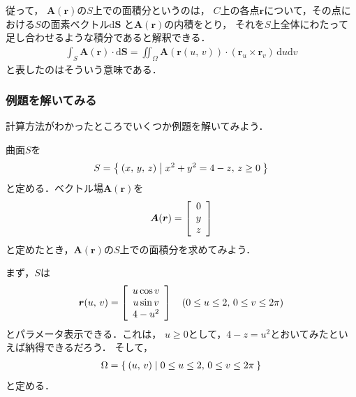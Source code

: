 従って，
$\bm{A}(\bm{r})$の$S$上での面積分というのは，
$C$上の各点$\bm{r}$について，その点における$S$の面素ベクトル$\mathrm{d}\bm{S}$
と$\bm{A}(\bm{r})$の内積をとり，
それを$S$上全体にわたって足し合わせるような積分であると解釈できる．
\begin{align}
\int_S \bm{A}(\bm{r}) \cdot \mathrm{d} \bm{S} 
= \iint_{\Omega} \bm{A}( \bm{r}(u, \, v)) \cdot ( \bm{r}_u \times \bm{r}_v ) 
\, \mathrm{d}u \mathrm{d}v
\label{eq:mensekibunkeisan}
\end{align}
と表したのはそういう意味である．
\subsubsection{例題を解いてみる}
計算方法がわかったところでいくつか例題を解いてみよう．

曲面$S$を
\begin{align*}
S = \Set{ (x, \, y, \, z) | x^2 + y^2 = 4 - z , \, z \geq 0}
\end{align*}
と定める．ベクトル場$\bm{A}(\bm{r})$を
\begin{align*}
\bm{A} (\bm{r} ) = \left[
\renewcommand{\arraystretch}{1}
\begin{array}{c}
0 \\
y \\
z
\end{array}
\right]
\end{align*}
と定めたとき，$\bm{A}(\bm{r})$の$S$上での面積分を求めてみよう．

まず，$S$は
\begin{align*}
\bm{r} (u, \, v) = \left[
\renewcommand{\arraystretch}{1}
\begin{array}{c}
u \cos v  \\ 
u \sin v \\
4 - u^2 
\end{array}
\right]
\quad ( 0 \leq u \leq 2 , \, 0 \leq v \leq 2 \pi )  
\end{align*}
とパラメータ表示できる．これは，
$u \geq 0$として，$4-z=u^2$とおいてみたといえば納得できるだろう．
そして，
\begin{align*}
\Omega = \Set{ (u, \, v) |  0 \leq u \leq 2 , \, 0 \leq v \leq 2 \pi }
\end{align*}
と定める．

